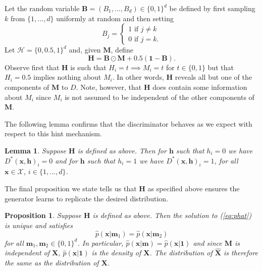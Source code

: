 \documentclass{article}
\newtheorem{proposition}{Proposition}
\newtheorem{lemma}{Lemma}
\begin{document}
Let the random variable $\mathbf{B} = (B_1, ..., B_d) \in \{0, 1\}^d$ be defined by first sampling $k$ from $\{1, ..., d\}$ uniformly at random and then setting 
\begin{equation} \label{eq:bdef}
B_j = \begin{cases}
1 \text{ if } j \neq k \\
0 \text{ if } j = k.
\end{cases}
\end{equation}
Let $\mathcal{H} = \{0, 0.5, 1\}^d$ and, given $\mathbf{M}$, define
\begin{equation} \label{eq:hdef}
\mathbf{H} = \mathbf{B} \odot \mathbf{M} + 0.5(\mathbf{1 - B}).
\end{equation}
Observe first that $\mathbf{H}$ is such that $H_i = t \implies M_i = t$ for $t \in \{0, 1\}$ but that $H_i = 0.5$ implies nothing about $M_i$. In other words, $\mathbf{H}$ reveals all but one of the components of $\mathbf{M}$ to $D$. Note, however, that $\mathbf{H}$ does contain some information about $M_i$ since $M_i$ is not assumed to be independent of the other components of $\mathbf{M}$.

The following lemma confirms that the discriminator behaves as we expect with respect to this hint mechanism.

\begin{lemma} \label{lem:DH}
	Suppose $\mathbf{H}$ is defined as above. Then for $\mathbf{h}$ such that $h_i = 0$ we have $D^*(\mathbf{x}, \mathbf{h})_i = 0$ and for $\mathbf{h}$ such that $h_i = 1$ we have $D^*(\mathbf{x}, \mathbf{h})_i = 1$, for all $\mathbf{x} \in \mathcal{X}$, $i \in \{1, ..., d\}$.
\end{lemma}

The final proposition we state tells us that $\mathbf{H}$ as specified above ensures the generator learns to replicate the desired distribution.

\begin{proposition}	\label{prop:h}
	Suppose $\mathbf{H}$ is defined as above. Then the solution to (\ref{eq:phat}) is unique and satisfies
	\begin{equation}
	\hat{p}(\mathbf{x} | \mathbf{m}_1) = \hat{p}(\mathbf{x} | \mathbf{m}_2)
	\end{equation}
	for all $\mathbf{m}_1, \mathbf{m}_2 \in \{0, 1\}^d$. In particular, $\hat{p}(\mathbf{x} | \mathbf{m}) = \hat{p}(\mathbf{x} | \mathbf{1})$ and since $\mathbf{M}$ is independent of $\mathbf{X}$, $\hat{p}(\mathbf{x} | \mathbf{1})$ is the density of $\mathbf{X}$. The distribution of $\hat{\mathbf{X}}$ is therefore the same as the distribution of $\mathbf{X}$.
\end{proposition}
\end{document}
